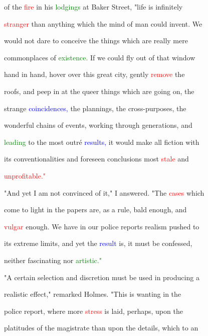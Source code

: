  of the \textcolor{red}{fire} in his \textcolor{green}{lodgings} at Baker Street, "life is infinitely

 \textcolor{red}{stranger} than anything which the mind of man could invent. We

 would not \textcolor{BurntOrange}{dare} to conceive the things which are really mere

 \textcolor{BurntOrange}{commonplaces} of \textcolor{green}{existence.} If we could fly out of that window

 hand in hand, hover over this great city, gently \textcolor{red}{remove} the

 roofs, and peep in at the queer things which are going on, the

 strange \textcolor{blue}{coincidences,} the \textcolor{BurntOrange}{plannings,} the cross-purposes, the

 \textcolor{BurntOrange}{wonderful} chains of events, working through generations, and

 \textcolor{green}{leading} to the most outré \textcolor{blue}{results,} it would make all fiction with

 its conventionalities and \textcolor{BurntOrange}{foreseen} conclusions most \textcolor{red}{stale} and

 \textcolor{red}{unprofitable."}



 "And yet I am not \textcolor{BurntOrange}{convinced} of it," I answered. "The \textcolor{red}{cases} which

 come to light in the papers are, as a \textcolor{BurntOrange}{rule,} bald enough, and

 \textcolor{red}{vulgar} enough. We have in our \textcolor{BurntOrange}{police} reports realism pushed to

 its extreme limits, and yet the \textcolor{blue}{result} is, it must be \textcolor{BurntOrange}{confessed,}

 neither fascinating nor \textcolor{green}{artistic."}



 "A certain selection and \textcolor{BurntOrange}{discretion} must be used in producing a

 realistic effect," remarked Holmes. "This is wanting in the

 \textcolor{BurntOrange}{police} report, where more \textcolor{red}{stress} is laid, perhaps, upon the

 platitudes of the magistrate than upon the details, which to an

